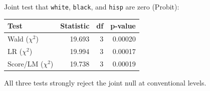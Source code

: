 \noindent Joint test that \texttt{white}, \texttt{black}, and \texttt{hisp} are zero (Probit):

\begin{table}[H]
\centering
\begin{tabular}{lrrr}
\toprule
Test & Statistic & df & p-value \\
\midrule
Wald ($\chi^2$) & 19.693 & 3 & 0.00020 \\
LR ($\chi^2$) & 19.994 & 3 & 0.00017 \\
Score/LM ($\chi^2$) & 19.738 & 3 & 0.00019 \\
\bottomrule
\end{tabular}
\end{table}

\noindent All three tests strongly reject the joint null at conventional levels.


